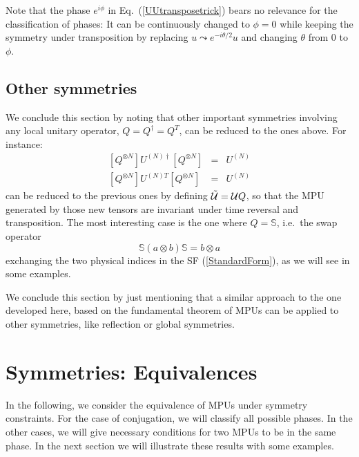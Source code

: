 \documentclass[pra,twocolumn,nofootinbib,superscriptaddress]{revtex4-1}
\newcommand{\be}{\begin{equation}}
\newcommand{\ee}{\end{equation}}
\newcommand{\bea}{\begin{eqnarray}}
\newcommand{\eea}{\end{eqnarray}}
\begin{document}
Note that the phase $e^{i\phi}$ in Eq.~(\ref{UUtransposetrick}) bears no
relevance for the classification of phases: It can be continuously changed
to $\phi=0$ while keeping the symmetry under transposition by replacing
$u\leadsto e^{-i\theta/2}u$ and changing $\theta$ from $0$ to $\phi$.





\subsection{\label{othersymmetries}
	Other symmetries}




We conclude this section by noting that other important symmetries
involving any local unitary operator, $Q=Q^\dagger=Q^T$, can be reduced to
the ones above. For instance:
\begin{subequations}
	\label{SSymmetries}
	\bea
	\label{SSymmetries-dagger}
	\left[Q^{\otimes N}\right] U^{(N)\dagger} \left[Q^{\otimes N}\right]&=& U^{(N)}\\
	\label{SSymmetries-transpose}
	\left[Q^{\otimes N}\right] U^{(N)T} \left[Q^{\otimes N}\right]&=& U^{(N)}
	\eea
\end{subequations}
can be reduced to the previous ones by defining $\tilde {\cal U}=  {\cal
	U}Q$, so that the MPU generated by those new tensors are invariant under
time reversal and transposition. The most interesting case is the one where
$Q=\mathbb S$, i.e.\ the swap operator
\be
\mathbb S(a \otimes b)\mathbb S=b\otimes a
\ee
exchanging the two physical indices in the
SF (\ref{StandardForm}), as we will see in some examples.

We conclude this section by just mentioning that a similar approach to the
one developed here, based on the fundamental theorem of MPUs can be
applied to other symmetries, like reflection or global symmetries.





\section{\label{sec:sym-conjugation}Symmetries: Equivalences}

In the following, we consider the equivalence of MPUs under
symmetry constraints. For the case of conjugation, we will classify all possible phases.
In the other cases, we will give necessary conditions for two MPUs to be in the same
phase. In the next section we will illustrate these results with some examples.
\end{document}
